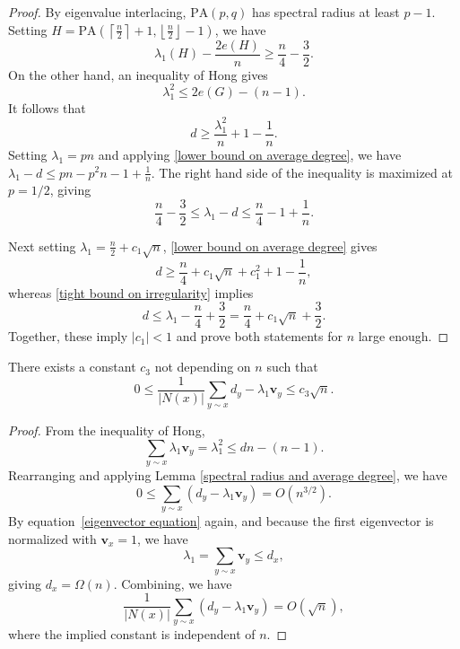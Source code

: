 \begin{proof}
By eigenvalue interlacing, $\mathrm{PA}(p,q)$ has spectral radius at least $p-1$. Setting 
 $H = \mathrm{PA}\left( \left\lceil \frac{n}{2}\right\rceil +1, \left\lfloor\frac{n}{2}\right\rfloor-1\right)$, we have 
\[
\lambda_1(H) - \frac{2e(H)}{n} \geq \frac{n}{4} - \frac{3}{2}.
\]
On the other hand, an inequality of Hong \cite{Hong1988} gives 
\[
\lambda_1^2 \leq 2e(G) - (n-1).
\]
It follows that
\begin{equation}\label{lower bound on average degree}
d \geq \frac{\lambda_1^2}{n} + 1 - \frac{1}{n}.
\end{equation}
Setting $\lambda_1 = pn$ and applying \eqref{lower bound on average degree}, we have $\lambda_1 - d \leq pn - p^2n -1 + \frac{1}{n}$. The right hand side of the inequality is maximized at $p=1/2$, giving 
\begin{equation}\label{tight bound on irregularity}
\frac{n}{4} - \frac{3}{2} \leq \lambda_1 - d \leq \frac{n}{4} - 1 + \frac{1}{n}.
\end{equation}

Next setting $\lambda_1 = \frac{n}{2} + c_1 \sqrt{n}$, \eqref{lower bound on average degree} gives
\[
d \geq \frac{n}{4} + c_1\sqrt{n} + c_1^2 + 1 - \frac{1}{n},
\]
whereas \eqref{tight bound on irregularity} implies
\begin{equation}\label{d bar bound}
d \leq \lambda_1 - \frac{n}{4} + \frac{3}{2}  = \frac{n}{4} + c_1\sqrt{n}  + \frac{3}{2}.
\end{equation}
Together, these imply $|c_1| <1$ and prove both statements for $n$ large enough.
\end{proof}

\begin{lemma}\label{error in x neighborhood small}
There exists a constant $c_3$ not depending on $n$ such that 
\[
0 \leq \frac{1}{|N(x)|} \sum_{y\sim x} d_y - \lambda_1 \mathbf{v}_y \leq c_3\sqrt{n}.
\]
\end{lemma}

\begin{proof}
From the inequality of Hong,
\[
\sum_{y\sim x} \lambda_1 \mathbf{v}_y = \lambda_1^2 \leq dn - (n-1).
\]
Rearranging and applying Lemma \ref{spectral radius and average degree}, we have
\[
0\leq \sum_{y\sim x} \left( d_y - \lambda_1 \mathbf{v}_y \right) = O\left(n^{3/2}\right).
\]
By equation~\eqref{eigenvector equation} again, and because the first eigenvector is normalized with $\mathbf{v}_x=1$, we have
\[
\lambda_1 = \sum_{y\sim x} \mathbf{v}_y \leq d_x,
\]
giving $d_x = \Omega(n)$. Combining, we have 
\[
\frac{1}{|N(x)|} \sum_{y\sim x} \left( d_y - \lambda_1 \mathbf{v}_y \right) = O\left(\sqrt{n}\right),
\]
where the implied constant is independent of $n$.
\end{proof}

